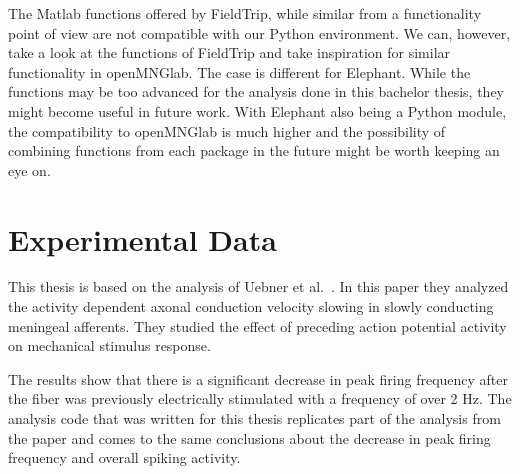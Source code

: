 The Matlab functions offered by FieldTrip, while similar from a functionality point of view are not compatible with our Python environment. We can, however, take a look at the functions of FieldTrip and take inspiration for similar functionality in openMNGlab.
The case is different for Elephant. While the functions may be too advanced for the analysis done in this bachelor thesis, they might become useful in future work.  With Elephant also being a Python module, the compatibility to openMNGlab is much higher and the possibility of combining functions from each package in the future might be worth keeping an eye on. 

\section{Experimental Data}
This thesis is based on the analysis of Uebner et al.~\cite{roberto}. In this paper they analyzed the activity dependent axonal conduction velocity slowing in slowly conducting meningeal afferents. They studied the effect of preceding action potential activity on mechanical stimulus response.

The results show that there is a significant decrease in peak firing frequency after the fiber was previously electrically stimulated with a frequency of over 2 Hz. The analysis code that was written for this thesis replicates part of the analysis from the paper and comes to the same conclusions about the decrease in peak firing frequency and overall spiking activity.




 
\cleardoublepage
